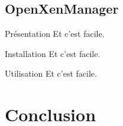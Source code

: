 \documentclass{beamer}
\begin{document}
\subsection{OpenXenManager}
\begin{frame}{Présentation}
  Et c'est facile.
\end{frame}
\begin{frame}{Installation}
  Et c'est facile.
\end{frame}
\begin{frame}{Utilisation}
  Et c'est facile.
\end{frame}

\section{Conclusion}
\end{document}
